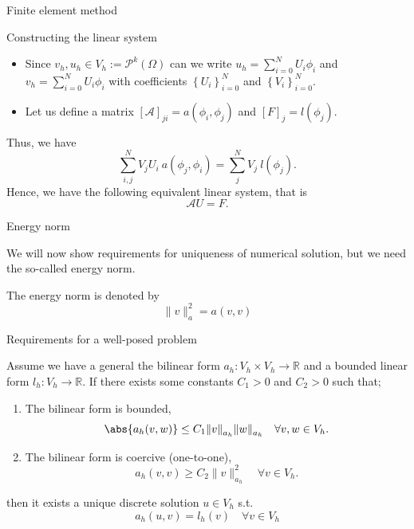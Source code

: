 \begin{frame}{Finite element method}

    \begin{block}{ Constructing the linear system  }
        \begin{itemize}
            \item Since $v_{h}, u_{h} \in V_{h} := \mathcal{P}^{k}( \Omega )  $ can we write $u_{h} = \sum_{i=0}^{N} U_{i} \phi _{i} $ and $v_{h} = \sum_{i=0}^{N} U_{i} \phi _{i} $ with coefficients $\left\{ U_{i} \right\}_{i=0} ^{N} $ and $\left\{ V_{i} \right\}_{i=0} ^{N} $.
        \item Let us define a matrix $\left[ \mathcal{A}  \right] _{ji} = a( \phi_{i}, \phi _{j} ) $ and $\left[ F \right] _{j} = l( \phi _{j})   $.
        \end{itemize}
    \end{block}
    Thus, we have \[
    \sum_{i,j}^{N} V_{j} U_{i}\ a( \phi_{j}, \phi _{i} ) =  \sum_{j}^{N} V_{j}\ l(\phi _{j})     .
    \]
    Hence, we have the following equivalent linear system, that is \[
    \mathcal{A} U = F.
    \]
\end{frame}

\begin{frame}{Energy norm}

   We will now show requirements for uniqueness of numerical solution, but we need the so-called energy norm.

   \begin{block}{  }
    The energy norm  is denoted by  \[
    \| v \|_{a  }^{ 2 } = a( v,v)
    \]
    \end{block}



\end{frame}

\begin{frame}{Requirements for a well-posed problem}
    \begin{theorem}
        Assume we have a general the bilinear form  $a_{h}: V_{h} \times V_{h} \to \mathbb{R}  $ and a bounded linear form $l_{h}: V_{h} \to \mathbb{R} $. If there exists some constants $C_{1} >0$ and $C_{2} >0$  such that;
        \begin{enumerate}
            \item The bilinear form is bounded,
                \[
                      \abs{a_{h}( v,w)  }    \le C_{1} \| v \|_{a_{h}  }^{  }  \| w \|_{a_{h}  }^{  } \quad \forall v,w  \in V_{h}.
                \]
            \item The bilinear form is coercive (one-to-one), \[
           a_{h}( v,v) \ge  C_{2} \| v \|_{ a_{h} }^{  2} \quad \forall v \in V_{h}.
            \]
        \end{enumerate}
        then it exists a unique discrete solution $u \in V_{h}$ s.t. \[
        a_{h}( u,v)  = l_{h}( v) \quad  \forall v \in V_{h}
        \]
    \end{theorem}


\end{frame}

